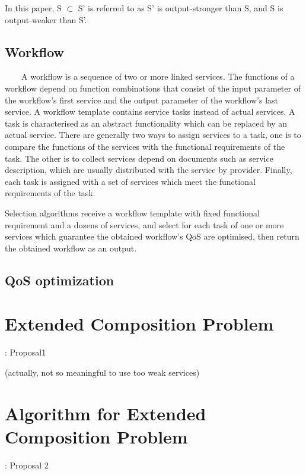 \documentclass[senior,final,11pt]{iscs-thesis}
\begin{document}
In this paper, S $\subset$ S' is referred to as S' is output-stronger than S, and S is output-weaker than S'.\\


\section{Workflow}
~~~~A workflow is a sequence of two or more linked services. The functions of a workflow depend on function combinations that consist of the input parameter of the workflow's first service and the output parameter of the workflow's last service. A workflow template contains service tasks instead of actual services. A task is characterised as an abstract functionality which can be replaced by an actual service. There are generally two ways to assign services to a task, one is to compare the functions of the services with the functional requirements of the task. The other is to collect services depend on documents such as service description, which are usually distributed with the service by provider. Finally, each task is assigned with a set of services which meet the functional requirements of the task.

Selection algorithms receive a workflow template with fixed functional requirement and a dozens of services, and select for each task of one or more services which guarantee the obtained workflow's QoS are optimised, then return the obtained workflow as an output.



\section{QoS optimization}

\chapter{Extended Composition Problem}: Proposal1

%
(actually, not so meaningful to use too weak services)


\chapter{Algorithm for Extended Composition Problem}: Proposal 2
\end{document}
